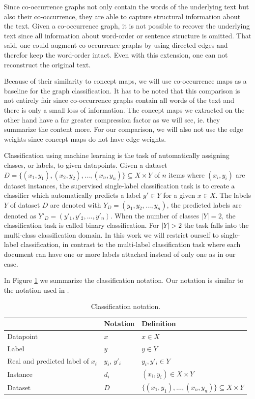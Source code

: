 Since co-occurrence graphs not only contain the words of the underlying text but also their co-occurrence, they are able to capture structural information about the text.
Given a co-occurrence graph, it is not possible to recover the underlying text since all information about word-order or sentence structure is omitted.
That said, one could augment co-occurrence graphs by using directed edges and therefor keep the word-order intact.
Even with this extension, one can not reconstruct the original text.

Because of their similarity to concept maps, we will use co-occurrence maps as a baseline for the graph classification.
It has to be noted that this comparison is not entirely fair since co-occurrence graphs contain all words of the text and there is only a small loss of information.
The concept maps we extracted on the other hand have a far greater compression factor as we will see, ie. they summarize the content more.
For our comparison, we will also not use the edge weights since concept maps do not have edge weights.


Classification using machine learning is the task of automatically assigning classes, or labels, to given datapoints.
Given a dataset $D = \{(x_1, y_1), (x_2, y_2), \ldots, (x_n, y_n) \} \subseteq X \times Y$ of $n$ items where $(x_i, y_i)$ are dataset instances, the supervised single-label classification task is to create a classifier which automatically predicts a label $y' \in Y$ for a given $x \in X$.
The labels $Y$ of dataset $D$ are denoted with $Y_D = (y_1, y_2, \ldots, y_n )$, the predicted labels are denoted as $Y'_D = (y'_1, y'_2, \ldots, y'_n )$.
When the number of classes $|Y| = 2$, the classification task is called binary classification. For $|Y| > 2$ the task falls into the multi-class classification domain.
In this work we will restrict ourself to single-label classification, in contrast to the multi-label classification task where each document can have one or more labels attached instead of only one as in our case.

In Figure \ref{table:classification_notation} we summarize the classification notation.
Our notation is similar to the notation used in \cite[p.~11]{Bishop2006}.

\begin{table}[htb!]
	\centering
	\begin{tabular}{lll}
\toprule
		& Notation & Definition \\
		\toprule
		Datapoint & $x$ & $x \in X$
		\\
		Label & $y$ & $y \in Y$
		\\
		Real and predicted label of $x_i$ & $y_i$, $y'_i$ &  $y_i, y'_i \in Y$
		\\
		Instance & $d_i$ & $(x_i, y_i) \in X \times Y$
		\\
		Dataset & $D$ & $\{(x_1, y_1), \ldots, (x_n, y_n) \} \subseteq X \times Y$ 
	\end{tabular}
	\caption[Notation: Classification]{Classification notation.}\label{table:classification_notation}
\end{table}

